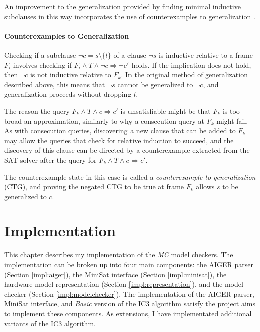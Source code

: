 \documentclass[12pt,a4paper,twoside,openright]{report}
\begin{document}
{%

An improvement to the generalization provided by finding minimal
inductive subclauses in this way incorporates the use of counterexamples
to generalization \cite{hassan13}.

\subsubsection{Counterexamples to Generalization}

Checking if a subclause $\neg c = s \setminus \{l\}$ of a clause $\neg s$ is inductive
relative to a frame $F_i$ involves checking if
$F_i \wedge T \wedge \neg c \Rightarrow \neg c'$ holds.
If the implication does not hold, then $\neg c$ is not inductive relative to
$F_k$. In the original method of generalization described above,
this means that $\neg s$ cannot be generalized to $\neg c$, and generalization
proceeds without dropping $l$.

The reason the query
$F_k \wedge T \wedge c \Rightarrow c'$ is unsatisfiable might be that
$F_k$ is too broad an approximation, similarly to why a consecution
query at $F_k$ might fail. As with consecution queries, discovering a
new clause that can be added to $F_k$ may allow the queries that
check for relative induction to succeed, and the discovery of this
clause can be directed by a counterexample extracted from the
SAT solver after the query for $F_k \wedge T \wedge c \Rightarrow c'$.

The counterexample state in this case is called a \emph{counterexample
to generalization} (CTG), and proving the negated CTG to be true at
frame $F_k$ allows $s$ to be generalized to $c$.


\chapter{Implementation}
\label{impl}

This chapter describes my implementation of the \emph{MC} model checkers.
The implementation can be broken up into four main components: the AIGER parser
(Section \ref{impl:aiger}), the
MiniSat interface (Section \ref{impl:minisat}), the hardware model representation
(Section \ref{impl:representation}), and the model checker
(Section \ref{impl:modelchecker}).
The implementation of the AIGER parser, MiniSat interface, and \emph{Basic} version
of the IC3 algorithm satisfy the project aims to implement these components. As
extensions, I have implementated additional variants of the IC3 algorithm.

}
\end{document}
